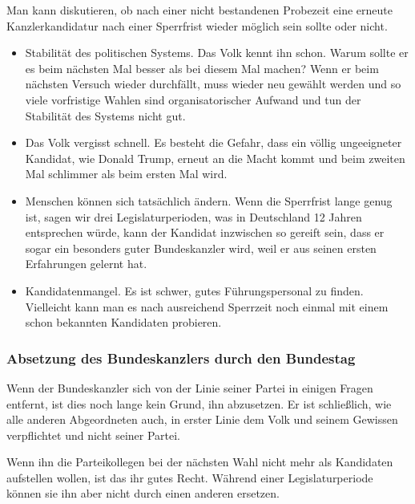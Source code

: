 Man kann diskutieren, ob nach einer nicht bestandenen Probezeit eine erneute Kanzlerkandidatur nach einer Sperrfrist wieder möglich sein sollte oder nicht.


\begin{itemize}
  \item Stabilität des politischen Systems. Das Volk kennt ihn schon. Warum sollte er es beim nächsten Mal besser als bei diesem Mal machen? Wenn er beim nächsten Versuch wieder durchfällt, muss wieder neu gewählt werden und so viele vorfristige Wahlen sind organisatorischer Aufwand und tun der Stabilität des Systems nicht gut.
  \item Das Volk vergisst schnell. Es besteht die Gefahr, dass ein völlig ungeeigneter Kandidat, wie Donald Trump, erneut an die Macht kommt und beim zweiten Mal schlimmer als beim ersten Mal wird.
 \end{itemize}

\begin{itemize}
  \item Menschen können sich tatsächlich ändern. Wenn die Sperrfrist lange genug ist, sagen wir drei Legislaturperioden, was in Deutschland 12 Jahren entsprechen würde, kann der Kandidat inzwischen so gereift sein, dass er sogar ein besonders guter Bundeskanzler wird, weil er aus seinen ersten Erfahrungen gelernt hat.
  \item Kandidatenmangel. Es ist schwer, gutes Führungspersonal zu finden. Vielleicht kann man es nach ausreichend Sperrzeit noch einmal mit einem schon bekannten Kandidaten probieren.
 \end{itemize}

\subsubsection{Absetzung des Bundeskanzlers durch den Bundestag}\label{subsubsec:absetzung_durch_bundestag}
Wenn der Bundeskanzler sich von der Linie seiner Partei in einigen Fragen entfernt, ist dies noch lange kein Grund, ihn abzusetzen.
Er ist schließlich, wie alle anderen Abgeordneten auch, in erster Linie dem Volk und seinem Gewissen verpflichtet und nicht seiner Partei.

Wenn ihn die Parteikollegen bei der nächsten Wahl nicht mehr als Kandidaten aufstellen wollen, ist das ihr gutes Recht.
Während einer Legislaturperiode können sie ihn aber nicht durch einen anderen ersetzen.

